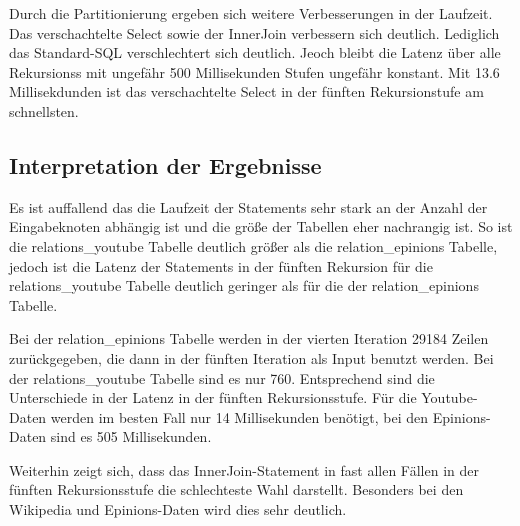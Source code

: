Durch die Partitionierung ergeben sich weitere Verbesserungen in der Laufzeit. Das verschachtelte Select sowie der InnerJoin verbessern sich deutlich. Lediglich das Standard-SQL verschlechtert sich deutlich. Jeoch bleibt die Latenz über alle Rekursionss mit ungefähr 500 Millisekunden Stufen ungefähr konstant.  Mit 13.6 Millisekdunden ist das verschachtelte Select in der fünften Rekursionstufe am schnellsten.   


\subsection{Interpretation der Ergebnisse}

Es ist auffallend das die Laufzeit der Statements sehr stark an der Anzahl der Eingabeknoten abhängig ist und die größe der Tabellen eher nachrangig ist. So ist die relations\_youtube Tabelle deutlich größer als die relation\_epinions Tabelle, jedoch ist die Latenz der Statements in der fünften Rekursion für die relations\_youtube Tabelle deutlich geringer als für die der relation\_epinions Tabelle.  

Bei der relation\_epinions Tabelle werden in der vierten Iteration 29184 Zeilen zurückgegeben, die dann in der fünften Iteration als Input benutzt werden. Bei der relations\_youtube Tabelle sind es nur 760. Entsprechend sind die Unterschiede in der Latenz in der fünften Rekursionsstufe. Für die Youtube-Daten werden im besten Fall nur 14 Millisekunden benötigt, bei den Epinions-Daten sind es 505 Millisekunden.

Weiterhin zeigt sich, dass das InnerJoin-Statement in fast allen Fällen in der fünften Rekursionsstufe die schlechteste Wahl darstellt. Besonders bei den Wikipedia und Epinions-Daten wird dies sehr deutlich.
